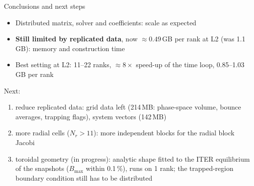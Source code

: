 \begin{frame}{Conclusions and next steps}
    \begin{itemize}
        \item Distributed matrix, solver and coefficients: scale as expected
        \item \textbf{Still limited by replicated data}, now $\approx 0.49$\,GB per rank at L2
              (was 1.1\,GB): memory and construction time
        \item Best setting at L2: 11--22 ranks, $\approx 8\times$ speed-up of the time loop,
              0.85--1.03\,GB per rank
    \end{itemize}
    \vspace{0.5em}
    Next:
    \begin{enumerate}
        \item reduce replicated data: grid data left (214\,MB: phase-space volume,
              bounce averages, trapping flags), system vectors (142\,MB)
        \item more radial cells ($N_r > 11$): more independent blocks for the radial block Jacobi
        \item toroidal geometry (in progress): analytic shape fitted to the ITER equilibrium
              of the snapshots ($B_\mathrm{max}$ within 0.1\,\%), runs on 1 rank;
              the trapped-region boundary condition still has to be distributed
    \end{enumerate}
\end{frame}
